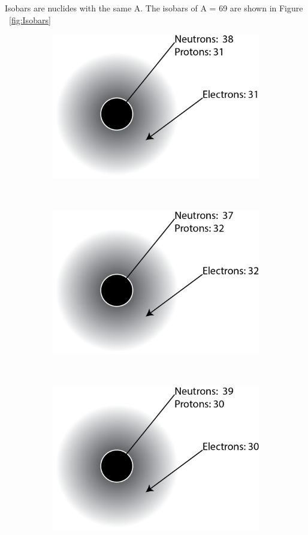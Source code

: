 \documentclass[11pt]{article}
\begin{document}
Isobars are nuclides with the same A.
The isobars of A = 69 are shown in Figure ~\ref{fig:Isobars}
\begin{figure}[!ht]
	\centering
	\begin{subfigure}[b]{0.3\textwidth}
		\centering
		\includegraphics[width=\textwidth]{HW2_69Ga.png}
	\end{subfigure}%
	~
	\begin{subfigure}[b]{0.3\textwidth}
		\centering
		\includegraphics[width=\textwidth]{HW2_69Ge.png}
	\end{subfigure}%
	~
	\begin{subfigure}[b]{0.3\textwidth}
		\centering
		\includegraphics[width=\textwidth]{HW2_69Zn.png}

\end{subfigure}
\end{figure}
\end{document}
